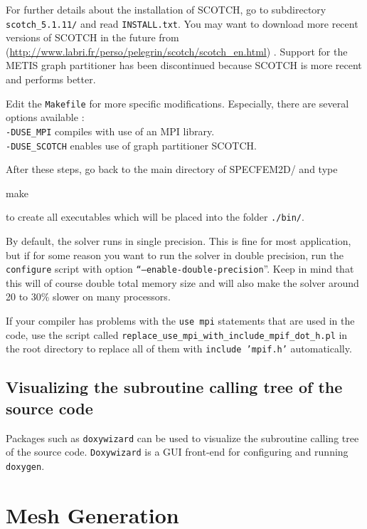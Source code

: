 \documentclass[oneside,english,onecolumn,letterpaper]{book}
\newenvironment{lyxcode}
{\begin{list}{}{
\setlength{\rightmargin}{\leftmargin}
\setlength{\listparindent}{0pt}%
\raggedright
\setlength{\itemsep}{0pt}
\setlength{\parsep}{0pt}
\normalfont\ttfamily}%
 \item[]}
{\end{list}}
\newcommand{\urlwithparentheses}[1]{(\url{#1})}
\begin{document}
For further details about the installation of SCOTCH,
go to subdirectory \texttt{scotch\_5.1.11/} and read \texttt{INSTALL.txt}. You may want to download more recent versions of SCOTCH in the future from \urlwithparentheses{http://www.labri.fr/perso/pelegrin/scotch/scotch_en.html} . Support for the METIS graph partitioner has been discontinued because SCOTCH is more recent and performs better.

Edit the \texttt{Makefile} for more specific modifications. Especially, there are several options available :\\
\texttt{-DUSE\_MPI} compiles with use of an MPI library. \\
\texttt{-DUSE\_SCOTCH} enables use of graph partitioner SCOTCH.

After these steps, go back to the main directory of SPECFEM2D/ and type
\begin{lyxcode}
make
\end{lyxcode}
to create all executables which will be placed into the folder \texttt{./bin/}.

By default, the solver runs in single precision. This is fine for most application, but if for some reason
you want to run the solver in double precision, run the \texttt{configure} script with option \texttt{``--enable-double-precision}''.
Keep in mind that this will of course double total memory size and will also make the solver around 20 to 30\% slower
on many processors.

If your compiler has problems with the \texttt{use mpi} statements that are used in the code, use the script called
\texttt{replace\_use\_mpi\_with\_include\_mpif\_dot\_h.pl} in the root directory to replace all of them with \texttt{include 'mpif.h'} automatically.

\section{Visualizing the subroutine calling tree of the source code}

Packages such as \texttt{doxywizard} can be used to visualize the subroutine calling tree of the source code.
\texttt{Doxywizard} is a GUI front-end for configuring and running \texttt{doxygen}.


\chapter{Mesh Generation}
\end{document}
